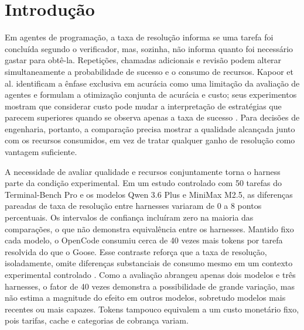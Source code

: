 \section{Introdução}

Em agentes de programação, a taxa de resolução informa se uma tarefa foi concluída segundo o verificador, mas, sozinha, não informa quanto foi necessário gastar para obtê-la. Repetições, chamadas adicionais e revisão podem alterar simultaneamente a probabilidade de sucesso e o consumo de recursos. Kapoor et al. identificam a ênfase exclusiva em acurácia como uma limitação da avaliação de agentes e formulam a otimização conjunta de acurácia e custo; seus experimentos mostram que considerar custo pode mudar a interpretação de estratégias que parecem superiores quando se observa apenas a taxa de sucesso \cite{Kapoor2024AIAgentsMatter}. Para decisões de engenharia, portanto, a comparação precisa mostrar a qualidade alcançada junto com os recursos consumidos, em vez de tratar qualquer ganho de resolução como vantagem suficiente.

A necessidade de avaliar qualidade e recursos conjuntamente torna o harness parte da condição experimental. Em um estudo controlado com 50 tarefas do Terminal-Bench Pro e os modelos Qwen 3.6 Plus e MiniMax M2.5, as diferenças pareadas de taxa de resolução entre harnesses variaram de 0 a 8 pontos percentuais. Os intervalos de confiança incluíram zero na maioria das comparações, o que não demonstra equivalência entre os harnesses. Mantido fixo cada modelo, o OpenCode consumiu cerca de 40 vezes mais tokens por tarefa resolvida do que o Goose. Esse contraste reforça que a taxa de resolução, isoladamente, omite diferenças substanciais de consumo mesmo em um contexto experimental controlado \cite{Vats2026ScaffoldEffect}. Como a avaliação abrangeu apenas dois modelos e três harnesses, o fator de 40 vezes demonstra a possibilidade de grande variação, mas não estima a magnitude do efeito em outros modelos, sobretudo modelos mais recentes ou mais capazes. Tokens tampouco equivalem a um custo monetário fixo, pois tarifas, cache e categorias de cobrança variam.

